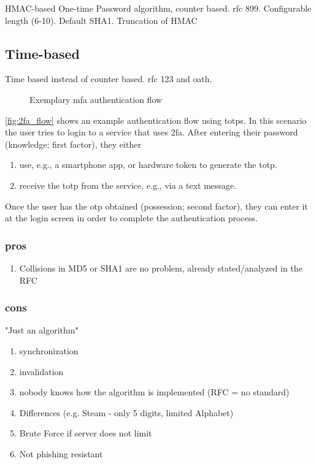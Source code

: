 HMAC-based One-time Password algorithm, counter based. \gls{rfc} 899. Configurable length (6-10). Default SHA1. Truncation of HMAC
\cite{m2005rfc}

\subsection{Time-based}
\label{subsec:totp}

Time based instead of counter based. \gls{rfc} 123 and \gls{oath}.
\cite{m2011rfc}

\begin{figure}[hbt]
	\centering
	
	\caption[Exemplary \gls{mfa} authentication flow]{Exemplary \gls{mfa} authentication flow\footnotemark}
	\label{fig:2fa_flow}
\end{figure}

\autoref{fig:2fa_flow} shows an example authentication flow using \glspl{totp}. In this scenario the user tries to login to a service that uses \gls{2fa}. After entering their password (knowledge; first factor), they either

\begin{enumerate}[label=(\alph*)]
	\item use, e.g., a smartphone app, or hardware token to generate the \gls{totp}.
	\item receive the \gls{totp} from the service, e.g., via a text message.
\end{enumerate}

Once the user has the \gls{otp} obtained (possession; second factor), they can enter it at the login screen in order to complete the authentication process.

\subsubsection{pros}

\begin{enumerate}
	\item Collisions in MD5 or SHA1 are no problem, already stated/analyzed in the RFC
\end{enumerate}

\subsubsection{cons}

"Just an algorithm"

\begin{enumerate}
	\item synchronization
	\item invalidation
	\item nobody knows how the algorithm is implemented (RFC = no standard)
	\item Differences (e.g. Steam - only 5 digits, limited Alphabet)
	\item Brute Force if server does not limit
	\item Not phishing resistant
\end{enumerate}